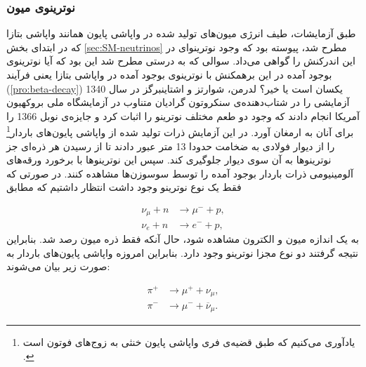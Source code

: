 \documentclass[a4paper]{book}
\begin{document}
\subsubsection{نوترینوی میون}
طبق آزمایشات، طیف انرژی میون‌های تولید شده در واپاشی پایون همانند واپاشی بتازا که در ابتدای بخش \ref{sec:SM-neutrinos} مطرح شد، پیوسته بود که وجود نوترینوای در این اندرکنش را گواهی می‌داد. سوالی که به درستی مطرح شد این بود که آیا نوترینوی بوجود آمده در این برهمکنش با نوترینوی بوجود آمده در واپاشی بتازا یعنی فرآیند (\ref{pro:beta-decay}) یکسان است یا خیر؟ لدرمن، شوارتز و اشتاینبرگز در سال 1340 آزمایشی را در شتاب‌دهنده‌ی سنکروتون گرادیان متناوب در آزمایشگاه ملی بروکهیون آمریکا انجام دادند که وجود دو طعم مختلف نوترینو را اثبات کرد \cite{AGC} و جایزه‌ی نوبل 1366 را برای آنان به ارمغان آورد. در این آزمایش ذرات تولید شده از واپاشی پایون‌های باردار\footnote{یادآوری می‌کنیم که طبق قضیه‌ی فری واپاشی پایون خنثی به زوج‌های فوتون است \cite{PhysRev.51.125}.} را از دیوار فولادی به ضخامت حدودا 13 متر عبور دادند تا از رسیدن هر ذره‌ای جز نوترینوها به آن سوی دیوار جلوگیری کند. سپس این نوترینوها با برخورد ورقه‌های آلومینیومی ذرات باردار بوجود آمده را توسط سوسوزن‌ها مشاهده کنند. در صورتی که فقط یک نوع نوترینو وجود داشت انتظار داشتیم که مطابق
\par
\vspace{-0.5cm}
{\footnotesize\begin{align}
	\nu_{\mu} +‌ n &\to \mu^- + p,\\
	\nu_e +‌ n &\to e^- + p,
\end{align}}
به یک اندازه میون و الکترون مشاهده شود، حال آنکه فقط ذره میون رصد شد. بنابراین نتیجه گرفتند دو نوع مجزا نوترینو وجود دارد. بنابراین امروزه واپاشی پایون‌های باردار به صورت زیر بیان می‌شوند:
\par
\vspace{-0.5cm}
{\footnotesize\begin{align} 
	\pi^+ &\to \mu^+ + \nu_{\mu},\\
	\pi^- &\to \mu^- + \overline{\nu}_{\mu}.
	\label{pro:pi-decay}
\end{align}}
\end{document}
